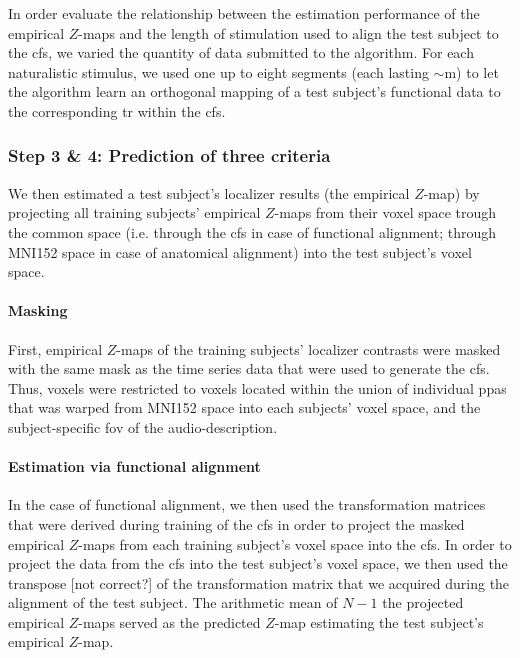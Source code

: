 In order evaluate the relationship between the estimation performance of the
empirical $Z$-maps and the length of stimulation used to align the test subject
to the \ac{cfs}, we varied the quantity of data submitted to the algorithm.
%
For each naturalistic stimulus, we used one up to eight segments (each lasting
$\sim$\unit[15]{m}) to let the algorithm learn an orthogonal mapping of a test
subject's functional data to the corresponding \acs{tr} within the \ac{cfs}.


\subsubsection{Step 3 \& 4: Prediction of three criteria}


We then estimated a test subject's localizer results (the empirical $Z$-map) by
projecting all training subjects' empirical $Z$-maps from their voxel space
trough the common space (i.e. through the \ac{cfs} in case of functional
alignment; through MNI152 space in case of anatomical alignment) into the test
subject's voxel space.


\paragraph{Masking}
%
First, empirical $Z$-maps of the training subjects' localizer contrasts were
masked with the same mask as the time series data that were used to generate the
\ac{cfs}.
%
Thus, voxels were restricted to voxels located within the union of individual
\acp{ppa} \citep[s.][]{haeusler2022processing} that was warped from MNI152 space
into each subjects' voxel space, and
the subject-specific \ac{fov} of the audio-description.


\paragraph{Estimation via functional alignment}
In the case of functional alignment, we then used the transformation matrices
that were derived during training of the \ac{cfs} in order to project the masked
empirical $Z$-maps from each training subject's voxel space into the \ac{cfs}.
In order to project the data from the \ac{cfs} into the test subject's voxel
space, we then used the transpose [not correct?] of the transformation matrix
that we acquired during the alignment of the test subject.
The arithmetic mean of $N-1$ the projected empirical $Z$-maps served as the
predicted $Z$-map estimating the test subject's empirical $Z$-map.





